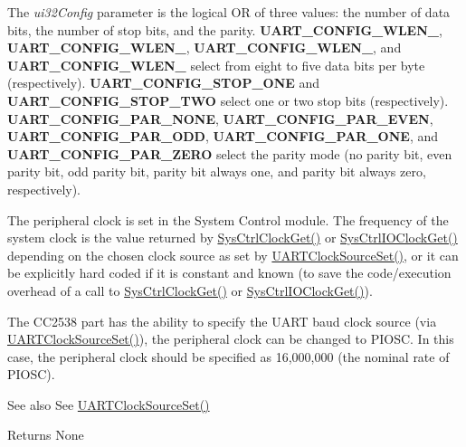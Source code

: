 The {\itshape ui32\+Config} parameter is the logical OR of three values\+: the number of data bits, the number of stop bits, and the parity. {\bfseries U\+A\+R\+T\+\_\+\+C\+O\+N\+F\+I\+G\+\_\+\+W\+L\+E\+N\+\_}, {\bfseries U\+A\+R\+T\+\_\+\+C\+O\+N\+F\+I\+G\+\_\+\+W\+L\+E\+N\+\_}, {\bfseries U\+A\+R\+T\+\_\+\+C\+O\+N\+F\+I\+G\+\_\+\+W\+L\+E\+N\+\_}, and {\bfseries U\+A\+R\+T\+\_\+\+C\+O\+N\+F\+I\+G\+\_\+\+W\+L\+E\+N\+\_} select from eight to five data bits per byte (respectively). {\bfseries U\+A\+R\+T\+\_\+\+C\+O\+N\+F\+I\+G\+\_\+\+S\+T\+O\+P\+\_\+\+O\+NE} and {\bfseries U\+A\+R\+T\+\_\+\+C\+O\+N\+F\+I\+G\+\_\+\+S\+T\+O\+P\+\_\+\+T\+WO} select one or two stop bits (respectively). {\bfseries U\+A\+R\+T\+\_\+\+C\+O\+N\+F\+I\+G\+\_\+\+P\+A\+R\+\_\+\+N\+O\+NE}, {\bfseries U\+A\+R\+T\+\_\+\+C\+O\+N\+F\+I\+G\+\_\+\+P\+A\+R\+\_\+\+E\+V\+EN}, {\bfseries U\+A\+R\+T\+\_\+\+C\+O\+N\+F\+I\+G\+\_\+\+P\+A\+R\+\_\+\+O\+DD}, {\bfseries U\+A\+R\+T\+\_\+\+C\+O\+N\+F\+I\+G\+\_\+\+P\+A\+R\+\_\+\+O\+NE}, and {\bfseries U\+A\+R\+T\+\_\+\+C\+O\+N\+F\+I\+G\+\_\+\+P\+A\+R\+\_\+\+Z\+E\+RO} select the parity mode (no parity bit, even parity bit, odd parity bit, parity bit always one, and parity bit always zero, respectively).

The peripheral clock is set in the System Control module. The frequency of the system clock is the value returned by \hyperlink{group__sysctl__api_ga9ad809b6591f052d72dde7b1fb1f6eed}{Sys\+Ctrl\+Clock\+Get()} or \hyperlink{group__sysctl__api_ga61cdfa03e9a592cfad5ef7ba81595046}{Sys\+Ctrl\+I\+O\+Clock\+Get()} depending on the chosen clock source as set by \hyperlink{group__uart__api_ga9aa412a7fe9755f7f7e3e98c95a44ef7}{U\+A\+R\+T\+Clock\+Source\+Set()}, or it can be explicitly hard coded if it is constant and known (to save the code/execution overhead of a call to \hyperlink{group__sysctl__api_ga9ad809b6591f052d72dde7b1fb1f6eed}{Sys\+Ctrl\+Clock\+Get()} or \hyperlink{group__sysctl__api_ga61cdfa03e9a592cfad5ef7ba81595046}{Sys\+Ctrl\+I\+O\+Clock\+Get()}).

The C\+C2538 part has the ability to specify the U\+A\+RT baud clock source (via \hyperlink{group__uart__api_ga9aa412a7fe9755f7f7e3e98c95a44ef7}{U\+A\+R\+T\+Clock\+Source\+Set()}), the peripheral clock can be changed to P\+I\+O\+SC. In this case, the peripheral clock should be specified as 16,000,000 (the nominal rate of P\+I\+O\+SC).

\begin{DoxySeeAlso}{See also}
See \hyperlink{group__uart__api_ga9aa412a7fe9755f7f7e3e98c95a44ef7}{U\+A\+R\+T\+Clock\+Source\+Set()}
\end{DoxySeeAlso}
\begin{DoxyReturn}{Returns}
None 
\end{DoxyReturn}


